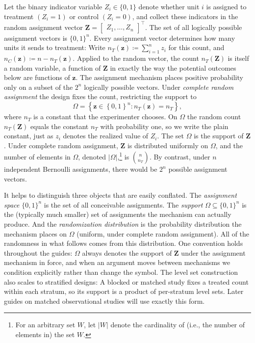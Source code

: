 \documentclass[12pt,leqno]{article}
\theoremstyle{newstyle}
\newcommand{\bZ}{\bm{Z}}   \newcommand{\bz}{\bm{z}}   %
\begin{document}
Let the binary indicator variable $Z_i \in \{0, 1\}$ denote whether unit $i$ is assigned to treatment $(Z_i = 1)$ or control $(Z_i = 0)$, and collect these indicators in the random assignment vector $\bZ = \begin{bmatrix} Z_1, \dots , Z_n\end{bmatrix}^\top$. The set of all logically possible assignment vectors is $\{0, 1\}^n$. Every assignment vector determines how many units it sends to treatment: Write $n_T(\bz) \coloneqq \sum_{i = 1}^n z_i$ for this count, and $n_C(\bz) \coloneqq n - n_T(\bz)$. Applied to the random vector, the count $n_T(\bZ)$ is itself a random variable, a function of $\bZ$ in exactly the way the potential outcomes below are functions of $\bz$. The assignment mechanism places positive probability only on a subset of the $2^n$ logically possible vectors. Under \textit{complete random assignment} the design fixes the count, restricting the support to
\begin{equation*}
\Omega = \left\{\bz \in \left\{0, 1\right\}^n: n_T(\bz) = n_T\right\},
\end{equation*}
where $n_T$ is a constant that the experimenter chooses. On $\Omega$ the random count $n_T(\bZ)$ equals the constant $n_T$ with probability one, so we write the plain constant, just as $z_i$ denotes the realized value of $Z_i$. The set $\Omega$ is the support of $\bZ$. Under complete random assignment, $\bZ$ is distributed uniformly on $\Omega$, and the number of elements in $\Omega$, denoted $\lvert \Omega \rvert$,\footnote{For an arbitrary set $W$, let $\lvert W \rvert$ denote the cardinality of (i.e., the number of elements in) the set $W$.} is $\binom{n}{n_T}$. By contrast, under $n$ independent Bernoulli assignments, there would be $2^n$ possible assignment vectors.

It helps to distinguish three objects that are easily conflated. The \textit{assignment space} $\{0, 1\}^n$ is the set of all conceivable assignments. The \textit{support} $\Omega \subseteq \{0, 1\}^n$ is the (typically much smaller) set of assignments the mechanism can actually produce. And the \textit{randomization distribution} is the probability distribution the mechanism places on $\Omega$ (uniform, under complete random assignment). All of the randomness in what follows comes from this distribution. One convention holds throughout the guides: $\Omega$ always denotes the support of $\bZ$ under the assignment mechanism in force, and when an argument moves between mechanisms we condition explicitly rather than change the symbol. The level set construction also scales to stratified designs: A blocked or matched study fixes a treated count within each stratum, so its support is a product of per-stratum level sets. Later guides on matched observational studies will use exactly this form.
\end{document}
